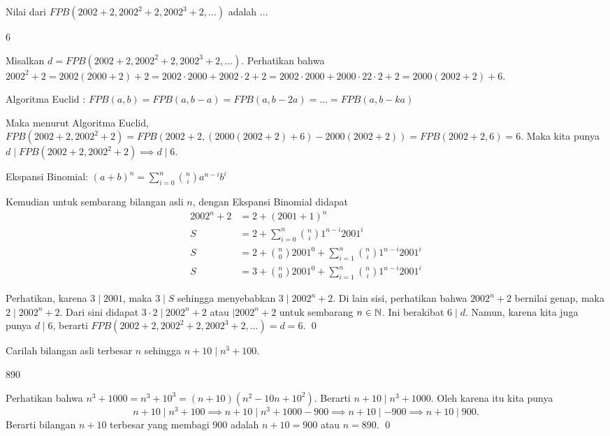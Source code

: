 \documentclass[11pt]{scrartcl}
\begin{document}
	\begin{soaljawab}
		Nilai dari $FPB(2002+2,2002^2+2,2002^3+2,\dots)$ adalah $\dots$
		
		\begin{jawaban}
		  	6
		\end{jawaban}
		\begin{solusi}
		Misalkan $d=FPB(2002+2,2002^2+2,2002^3+2,\dots)$. Perhatikan bahwa $2002^2+2=2002(2000+2)+2=2002\cdot 2000+2002\cdot 2+2=2002\cdot 2000+2000\cdot 2 2\cdot 2+2=2000(2002+2)+6$. 
			\begin{lemmarev}
			Algoritma Euclid : $FPB(a,b)=FPB(a,b-a)=FPB(a,b-2a)=\dots =FPB(a,b-ka)$
			\end{lemmarev}
		Maka menurut Algoritma Euclid, $FPB(2002+2,2002^2+2)=FPB(2002+2,(2000(2002+2)+6)-2000(2002+2))=FPB(2002+2,6)=6$. Maka kita punya $d \mid FPB(2002+2,2002^2+2) \implies d \mid 6$. 
		
		\begin{lemmarev}
					Ekspansi Binomial: $(a+b)^n=\sum_{i=0}^{n} {n \choose i}a^{n-i}b^i$
					\end{lemmarev}
		
		Kemudian untuk sembarang bilangan asli $n$, dengan Ekspansi Binomial didapat
		\begin{align*}
		2002^n+2 &= 2+(2001+1)^n\\
			S	&= 2 + \sum_{i=0}^{n} {n \choose i}1^{n-i}2001^i\\
			S	&= 2 + {n \choose 0}2001^0 + \sum_{i=1}^{n} {n \choose i}1^{n-i}2001^i\\
			S	&= 3 + {n \choose 0}2001^0 + \sum_{i=1}^{n} {n \choose i}1^{n-i}2001^i
		\end{align*}
			
		Perhatikan, karena $3 \mid 2001$, maka $3 \mid S$ sehingga menyebabkan $3 \mid 2002^n+2$. Di lain sisi, perhatikan bahwa $2002^n+2$ bernilai genap, maka $2 \mid 2002^n +2$. Dari sini didapat $3\cdot2 \mid 2002^n+2$ atau $\mid 2002^n+2$ untuk sembarang $n \in \mathbb N$. Ini berakibat $6 \mid d$. Namun, karena kita juga punya $d \mid 6$, berarti $FPB(2002+2,2002^2+2,2002^3+2,\dots)=d=6$. \qed
		\end{solusi}
	\end{soaljawab}
	
	\begin{soaljawab}
		Carilah bilangan asli terbesar $n$ sehingga $n+10 \mid n^3+100$.
		
		\begin{jawaban}
		890
		\end{jawaban}
		\begin{solusi}
		Perhatikan bahwa $n^3+1000=n^3+10^3=(n+10)(n^2-10n+10^2)$. Berarti $n+10 \mid n^3+1000$. Oleh karena itu kita punya $$n+10 \mid n^3+100 \implies n+10 \mid n^3+1000-900 \implies n+10 \mid -900 \implies n+10 \mid 900.$$Berarti bilangan $n+10$ terbesar yang membagi 900 adalah $n+10=900$ atau $n=890$. \qed
		\end{solusi}
	\end{soaljawab}
\end{document}
